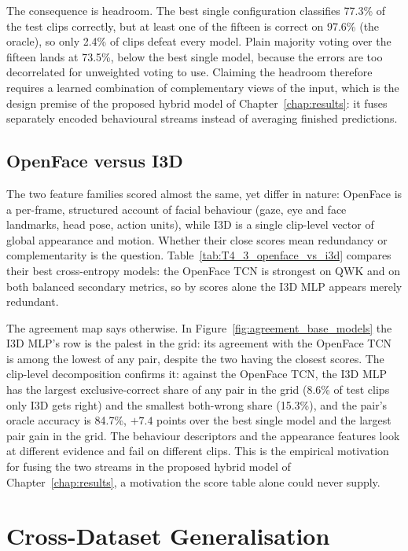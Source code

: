 \documentclass[../main.tex]{subfiles}
\begin{document}
The consequence is headroom. The best single configuration classifies 77.3\% of the test clips correctly, but at least one of the fifteen is correct on 97.6\% (the oracle), so only 2.4\% of clips defeat every model. Plain majority voting over the fifteen lands at 73.5\%, below the best single model, because the errors are too decorrelated for unweighted voting to use. Claiming the headroom therefore requires a learned combination of complementary views of the input, which is the design premise of the proposed hybrid model of Chapter~\ref{chap:results}: it fuses separately encoded behavioural streams instead of averaging finished predictions.

\subsection{OpenFace versus I3D}
\label{sec:openface-vs-i3d}

The two feature families scored almost the same, yet differ in nature: OpenFace is a per-frame, structured account of facial behaviour (gaze, eye and face landmarks, head pose, action units), while I3D is a single clip-level vector of global appearance and motion. Whether their close scores mean redundancy or complementarity is the question. Table~\ref{tab:T4_3_openface_vs_i3d} compares their best cross-entropy models: the OpenFace TCN is strongest on QWK and on both balanced secondary metrics, so by scores alone the I3D MLP appears merely redundant.


The agreement map says otherwise. In Figure~\ref{fig:agreement_base_models} the I3D MLP's row is the palest in the grid: its agreement with the OpenFace TCN is among the lowest of any pair, despite the two having the closest scores. The clip-level decomposition confirms it: against the OpenFace TCN, the I3D MLP has the largest exclusive-correct share of any pair in the grid (8.6\% of test clips only I3D gets right) and the smallest both-wrong share (15.3\%), and the pair's oracle accuracy is 84.7\%, $+7.4$ points over the best single model and the largest pair gain in the grid. The behaviour descriptors and the appearance features look at different evidence and fail on different clips. This is the empirical motivation for fusing the two streams in the proposed hybrid model of Chapter~\ref{chap:results}, a motivation the score table alone could never supply.

\FloatBarrier
\section{Cross-Dataset Generalisation}
\label{sec:crossdomain}
\end{document}
